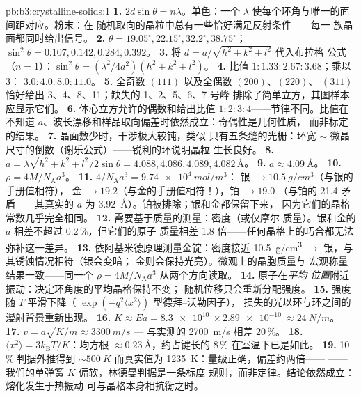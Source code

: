 \begin{solution}{pb:b3:crystalline-solids:1}
\textbf{1.} $2d\sin\theta = n\lambda$。单色：一个
$\lambda$ 使每个环角与唯一的面间距对应。粉末：在
随机取向的晶粒中总有一些恰好满足反射条件——每一
族晶面都同时给出信号。
\textbf{2.} $\theta = 19.05^\circ, 22.15^\circ, 32.2^\circ,
38.75^\circ$；$\sin^2\theta = 0.107, 0.142, 0.284, 0.392$。
\textbf{3.} 将 $d = a/\sqrt{h^2+k^2+l^2}$ 代入布拉格
公式（$n = 1$）：$\sin^2\theta = (\lambda^2/4a^2)(h^2+k^2+l^2)$。
\textbf{4.} 比值 $1 : 1.33 : 2.67 : 3.68$；乘以 3：
$3.0 : 4.0 : 8.0 : 11.0$。
\textbf{5.} 全奇数 $(111)$ 以及全偶数 $(200)$、$(220)$、
$(311)$ 恰好给出 3、4、8、11；缺失的 1、2、5、6、7 号峰
排除了简单立方，其图样本应显示它们。
\textbf{6.} 体心立方允许的偶数和给出比值
$1:2:3:4$——节律不同。比值在不知道
$a$、波长漂移和样品取向偏差时依然成立：奇偶性是几何性质，
而非标定的结果。
\textbf{7.} 晶面数少时，干涉极大较钝，类似
只有五条缝的光栅：环宽 $\sim$ 微晶
尺寸的倒数（谢乐公式）——锐利的环说明晶粒
生长良好。
\textbf{8.} $a = \lambda\sqrt{h^2+k^2+l^2}/2\sin\theta = 4.088,
4.086, 4.089, 4.082\,\unit{\angstrom}$。
\textbf{9.} $a \approx \qty{4.09}{\angstrom}$。
\textbf{10.} $\rho = 4M/N_{\text{A}}a^3$。
\textbf{11.} $4/N_{\text{A}}a^3 = \qty{9.74e4}{mol/m^3}$：
银 $\to \qty{10.5}{g/cm^3}$（与银的手册值相符），
金 $\to 19.2$（与金的手册值相符！），铂 $\to 19.0$
（与铂的 21.4 矛盾——其真实的 $a$ 为
\qty{3.92}{\angstrom}）。铂被排除；银和金都保留下来，
因为它们的晶格常数几乎完全相同。
\textbf{12.} 需要基于质量的测量：密度（或仅摩尔
质量）。银和金的 $a$ 相差不超过 0.2\,\%，但它们的原子
质量相差 1.8 倍——任何晶格上的巧合都无法
弥补这一差异。
\textbf{13.} 依阿基米德原理测量金锭：密度接近 \qty{10.5}{g/cm^3}
$\to$ 银，与其锈蚀情况相符（银会变暗；
金则会保持光亮）。微观上的晶胞质量与
宏观称量结果一致——同一个
$\rho = 4M/N_{\text{A}}a^3$ 从两个方向读取。
\textbf{14.} 原子在\emph{平均
位置}附近振动：决定环角度的平均晶格保持不变；
随机位移只会重新分配强度。
\textbf{15.} 强度随 $T$ 平滑下降（
$\exp(-q^2\langle x^2\rangle)$ 型德拜–沃勒因子），
损失的光以环与环之间的漫射背景重新出现。
\textbf{16.} $K \approx Ea = \qty{8.3e10}{}\times
\qty{2.89e-10}{} \approx \qty{24}{N/m}$。
\textbf{17.} $v = a\sqrt{K/m} \approx \qty{3300}{m/s}$ ---
与实测的 \qty{2700}{m/s} 相差 20\,\%。
\textbf{18.} $\langle x^2\rangle = 3k_{\text{B}}T/K$：均方根
$\approx\qty{0.23}{\angstrom}$，约占键长的 8\,\%
在室温下已是如此。
\textbf{19.} 10\,\% 判据外推得到 $\sim\qty{500}{K}$
而真实值为 \qty{1235}{K}：量级正确，偏差约两倍——
——我们的单弹簧 $K$ 偏软，林德曼判据是一条标度
规则，而非定律。结论依然成立：熔化发生于热振动
可与晶格本身相抗衡之时。

\end{solution}
